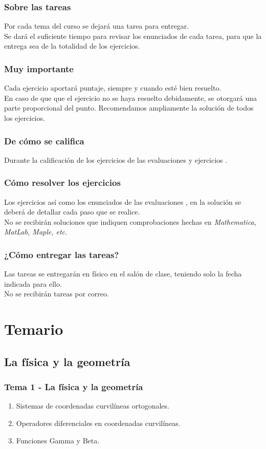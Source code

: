 \documentclass[12pt]{beamer}
\begin{document}
\begin{frame}
\frametitle{Sobre las tareas}
Por cada tema del curso se dejará una tarea para entregar.
\\
\bigskip
\pause
Se dará el suficiente tiempo para revisar los enunciados de cada tarea, para que la entrega sea de la totalidad de los ejercicios.
\end{frame}
\begin{frame}
\frametitle{Muy importante}
Cada ejercicio aportará puntaje, siempre y cuando esté bien resuelto.
\\
\bigskip
\pause
En caso de que que el ejercicio no se haya resuelto debidamente, se otorgará una parte proporcional del punto. Recomendamos ampliamente la solución de todos los ejercicios.
\end{frame}
\begin{frame}
\frametitle{De cómo se califica}
Durante la calificación de los ejercicios de las evaluaciones y ejercicios \pause {}.
\end{frame}
\begin{frame}
\frametitle{Cómo resolver los ejercicios}
Los ejercicios así como los enunciados de las evaluaciones , en la solución se deberá de detallar cada paso que se realice.
\\
\bigskip
\pause
No se recibirán soluciones que indiquen comprobaciones hechas en \emph{Mathematica, MatLab, Maple, etc.}
\end{frame}
\begin{frame}
\frametitle{¿Cómo entregar las tareas?}
Las tareas se entregarán en físico en el salón de clase, teniendo solo la fecha indicada para ello.
\\
\bigskip
No se recibirán tareas por correo.
\end{frame}

\section{Temario}


\subsection{La física y la geometría}

\begin{frame}
\frametitle{Tema 1 - La física y la geometría}
\begin{enumerate}[<+->]
\item Sistemas de coordenadas curvilíneas ortogonales.
\item Operadores diferenciales en coordenadas curvilíneas.
\item Funciones Gamma y Beta.
\end{enumerate}
\end{frame}
\end{document}
